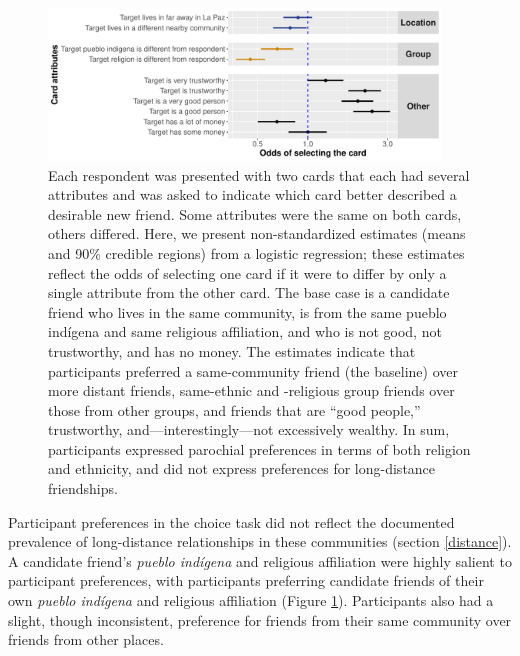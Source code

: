 \documentclass[bibauthoryear]{aa}
\begin{document}
 \begin{figure}[t]
 \centering
\includegraphics[width=4.10in]{Bolivia_CardChoice_Non-Standardized_CR}
\caption{{\footnotesize Each respondent was presented with two cards that each had several attributes and was asked to indicate which card better described a desirable new friend. Some attributes were the same on both cards, others differed. Here, we present non-standardized estimates (means and 90\% credible regions) from a logistic regression; these estimates reflect the odds of selecting one card if it were to differ by only a single attribute from the other card. The base case is a candidate friend who lives in the same community, is from the same pueblo ind\'igena and same religious affiliation, and who is not good, not trustworthy, and has no money. The estimates indicate that participants preferred a same-community friend (the baseline) over more distant friends, same-ethnic and -religious group friends over those from other groups, and friends that are ``good people,'' trustworthy, and---interestingly---not excessively wealthy. In sum, participants expressed parochial preferences in terms of both religion and ethnicity, and did not express preferences for long-distance friendships.
}
} \label{boliviacards}
\end{figure}



	Participant preferences in the choice task did not reflect the documented prevalence of long-distance relationships in these communities (section \ref{distance}). A candidate friend's \textit{pueblo ind\'igena} and religious affiliation were highly salient to participant preferences, with participants preferring candidate friends of their own \textit{pueblo ind\'igena} and religious affiliation (Figure \ref{boliviacards}). Participants also had a slight, though inconsistent, preference for friends from their same community over friends from other places. 
	
\end{document}
